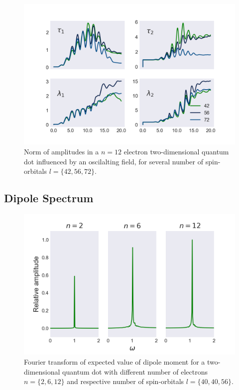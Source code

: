 \begin{figure}
    \centering
    \includegraphics{results/figures/2D/n=12_amplitudes.png}
    \caption{Norm of amplitudes in a $n=12$ electron two-dimensional quantum 
        dot influenced by an oscilalting field, for several number of 
        spin-orbitals $l=\{42,56,72\}$.
    }
    \label{fig:n12_2d_amp_norms}
\end{figure}

\subsection{Dipole Spectrum}

\begin{figure}
    \centering
    \includegraphics[width=\textwidth]{results/figures/2D/2d_spectrum.png} 
    \caption{Fourier transform of expected value of dipole moment for a
        two-dimensional quantum dot with different number of electrons 
        $n=\{2,6,12\}$ and respective number of spin-orbitals 
        $l=\{40,40,56\}$.
    }
    \label{fig:2d_dipole_spectra}
\end{figure}    

